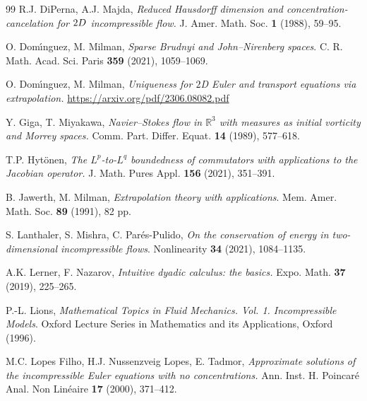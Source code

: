 \documentclass[11pt, a4paper,leqno]{amsart}
\theoremstyle{plain}
\numberwithin{equation}{section}
\theoremstyle{definition}
\theoremstyle{remark}
\begin{document}
\begin{thebibliography}{99}
R.J. DiPerna, A.J. Majda, \emph{Reduced Hausdorff
dimension and concentration-cancelation for $2\emph{D}$ incompressible flow.}
J. Amer. Math. Soc. \textbf{1} (1988), 59--95.

O. Dom\'{\i}nguez, M. Milman, \emph{Sparse Brudnyi and
John--Nirenberg spaces}. C. R. Math. Acad. Sci. Paris \textbf{359} (2021), 1059--1069.

O. Dom\'{\i}nguez, M. Milman, \emph{Uniqueness for $2$D Euler and transport equations via extrapolation.} \url{https://arxiv.org/pdf/2306.08082.pdf}


Y. Giga, T. Miyakawa, \emph{Navier--Stokes flow in
$\mathbb{R}^{3}$ with measures as initial vorticity and Morrey spaces.} Comm.
Part. Differ. Equat. \textbf{14} (1989), 577--618.

 T.P. Hyt\"onen, \emph{The $L^p$-to-$L^q$ boundedness of commutators with applications to the Jacobian operator.} J. Math. Pures Appl. \textbf{156} (2021), 351--391.

B. Jawerth, M. Milman, \emph{Extrapolation theory with
applications}. Mem. Amer. Math. Soc. \textbf{89 }(1991), 82 pp.




S. Lanthaler, S. Mishra, C. Par\'{e}s-Pulido, \emph{On the
conservation of energy in two-dimensional incompressible flows}. Nonlinearity
\textbf{34} (2021), 1084--1135.


A.K. Lerner, F. Nazarov, \emph{Intuitive dyadic calculus: the
basics.} Expo. Math. \textbf{37} (2019), 225--265.

P.-L. Lions, \emph{Mathematical Topics in Fluid Mechanics.
Vol. 1. Incompressible Models}. Oxford Lecture Series in Mathematics and its
Applications, Oxford (1996).

M.C. Lopes Filho, H.J. Nussenzveig Lopes, E. Tadmor,
\emph{Approximate solutions of the incompressible Euler equations with no
concentrations.} Ann. Inst. H. Poincar\'{e} Anal. Non Lin\'{e}aire \textbf{17
}(2000), 371--412.


\end{thebibliography}
\end{document}
